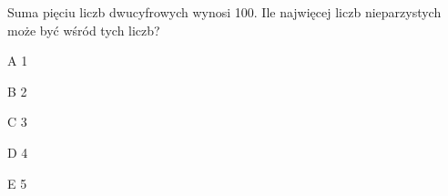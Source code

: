 \begin{tresc}
Suma pięciu liczb dwucyfrowych wynosi 100. Ile najwięcej liczb nieparzystych może być wśród tych liczb?
\end{tresc}
\begin{wariant}{A} 1 \end{wariant}
\begin{wariant}{B} 2 \end{wariant}
\begin{wariant}{C} 3 \end{wariant}
\begin{wariant}{D} 4 \end{wariant}
\begin{wariant}{E} 5 \end{wariant}
